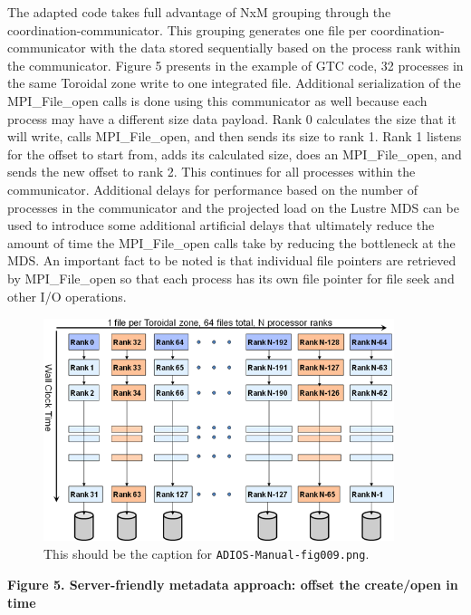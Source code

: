 \vspace{10pt}
The adapted code takes full advantage of NxM grouping through the coordination-communicator. 
This grouping generates one file per coordination-communicator with the data stored 
sequentially based on the process rank within the communicator.  Figure 5 presents 
in the example of GTC code, 32 processes in the same Toroidal zone write to one 
integrated file. Additional serialization of the MPI\_File\_open calls is done 
using this communicator as well because each process may have a different size 
data payload. Rank 0 calculates the size that it will write, calls MPI\_File\_open, 
and then sends its size to rank 1. Rank 1 listens for the offset to start from, 
adds its calculated size, does an MPI\_File\_open, and sends the new offset to 
rank 2. This continues for all processes within the communicator. Additional delays 
for performance based on the number of processes in the communicator and the projected 
load on the Lustre MDS can be used to introduce some additional artificial delays 
that ultimately reduce the amount of time the MPI\_File\_open calls take by reducing 
the bottleneck at the MDS. An important fact to be noted is that individual file 
pointers are retrieved by MPI\_File\_open so that each process has its own file 
pointer for file seek and other I/O operations.

\begin{figure}[htbp]
\begin{center}
\includegraphics[width=290pt, height=185pt]{ADIOS-Manual-fig009.png}
\caption{This should be the caption for \texttt{ADIOS-Manual-fig009.png}.}
\end{center}
\end{figure}\label{HRef140733021}\label{HRef140744843}\label{HToc144350164}

\vspace{22pt}
\begin{center}
{\color{color20} \textbf{Figure 5. Server-friendly metadata approach: offset the 
create/open in time}}
\end{center}

